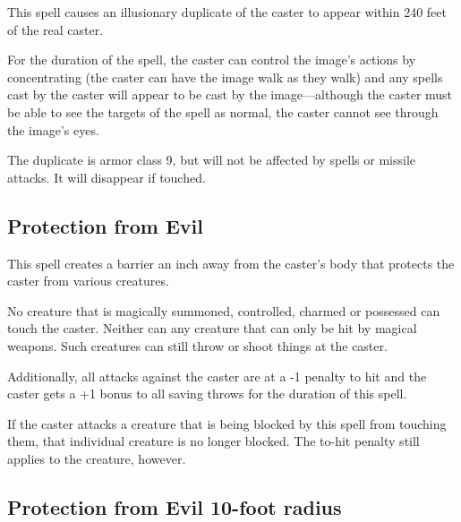 \begin{multicols*}{2}
This spell causes an illusionary duplicate of the caster to appear within 240 feet of the real caster.

For the duration of the spell, the caster can control the image’s actions by concentrating (the caster can have the image walk as they walk) and any spells cast by the caster will appear to be cast by the image—although the caster must be able to see the targets of the spell as normal, the caster cannot see through the image’s eyes.

The duplicate is armor class 9, but will not be affected by spells or missile attacks. It will disappear if touched.

\subsection{Protection from Evil}\label{spell:Protection from Evil}

This spell creates a barrier an inch away from the caster’s body that protects the caster from various creatures.

No creature that is magically summoned, controlled, charmed or possessed can touch the caster. Neither can any creature that can only be hit by magical weapons. Such creatures can still throw or shoot things at the caster.

Additionally, all attacks against the caster are at a -1 penalty to hit and the caster gets a +1 bonus to all saving throws for the duration of this spell.

If the caster attacks a creature that is being blocked by this spell from touching them, that individual creature is no longer blocked. The to-hit penalty still applies to the creature, however.

\subsection{Protection from Evil 10-foot radius}\label{spell:Protection from Evil 10-foot radius}
\end{multicols*}
